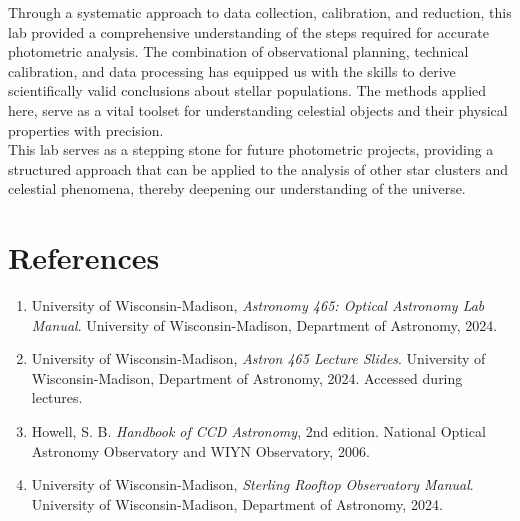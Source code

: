 \documentclass[linenumbers,twocolumn]{aastex631}
\begin{document}
Through a systematic approach to data collection, calibration, and reduction, this lab provided a comprehensive understanding of the steps required for accurate photometric analysis. The combination of observational planning, technical calibration, and data processing has equipped us with the skills to derive scientifically valid conclusions about stellar populations. The methods applied here, serve as a vital toolset for understanding celestial objects and their physical properties with precision. \\

This lab serves as a stepping stone for future photometric projects, providing a structured approach that can be applied to the analysis of other star clusters and celestial phenomena, thereby deepening our understanding of the universe.

\section{References}

\begin{enumerate}
    \item University of Wisconsin-Madison, \textit{Astronomy 465: Optical Astronomy Lab Manual}. University of Wisconsin-Madison, Department of Astronomy, 2024.
    
    \item University of Wisconsin-Madison, \textit{Astron 465 Lecture Slides}. University of Wisconsin-Madison, Department of Astronomy, 2024. Accessed during lectures.

    \item Howell, S. B. \textit{Handbook of CCD Astronomy}, 2nd edition. National Optical Astronomy Observatory and WIYN Observatory, 2006.

    \item University of Wisconsin-Madison, \textit{Sterling Rooftop Observatory Manual}. University of Wisconsin-Madison, Department of Astronomy, 2024.
\end{enumerate}
\end{document}
